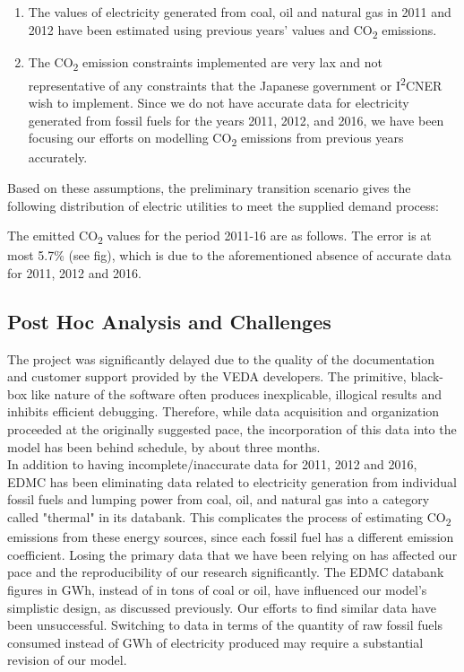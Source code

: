 \documentclass[14pt,a4paper]{article} %
\begin{document}
\begin{enumerate}
\item The values of electricity generated from coal, oil and natural gas in 2011 and 2012 have been estimated using previous years' values and CO\textsubscript{2} emissions.

\item The CO\textsubscript{2} emission constraints implemented are very lax and not representative of any constraints that the Japanese government or I\textsuperscript{2}CNER wish to implement. Since we do not have accurate data for electricity generated from fossil fuels for the years 2011, 2012, and 2016, we have been focusing our efforts on modelling CO\textsubscript{2} emissions from previous years accurately.

\end{enumerate}

Based on these assumptions, the preliminary transition scenario gives the following distribution of electric utilities to meet the supplied demand process:


The emitted CO\textsubscript{2} values for the period 2011-16 are as follows. The error is at most 5.7\% (see fig), which is due to the aforementioned absence of accurate data for 2011, 2012 and 2016. 

\subsection{Post Hoc Analysis and Challenges} 

The project was significantly delayed due to the quality of the documentation and customer support provided by the VEDA developers. The primitive, black-box like nature of the software often produces inexplicable, illogical results and inhibits efficient debugging. Therefore, while data acquisition and organization proceeded at the originally suggested pace, the incorporation of this data into the model has been behind schedule, by about three months. \\

In addition to having incomplete/inaccurate data for 2011, 2012 and 2016, EDMC has been eliminating data related to electricity generation from individual fossil fuels and lumping power from coal, oil, and natural gas into a category called "thermal" in its databank. This complicates the process of estimating CO\textsubscript{2} emissions from these energy sources, since each fossil fuel has a different emission coefficient. Losing the primary data that we have been relying on has affected our pace and the reproducibility of our research significantly. The EDMC databank figures in GWh, instead of in tons of coal or oil, have influenced our model's simplistic design, as discussed previously. Our efforts to find similar data have been unsuccessful. Switching to data in terms of the quantity of raw fossil fuels consumed instead of GWh of electricity produced may require a substantial revision of our model. 
\end{document}
